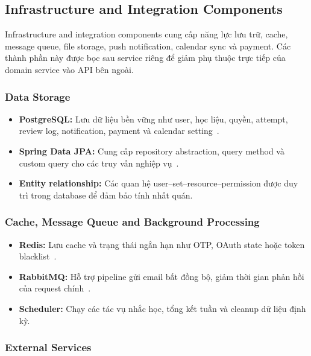 \subsection{Infrastructure and Integration Components}
\label{subsec:infrastructure-components}

Infrastructure and integration components cung cấp năng lực lưu trữ, cache, message queue, file storage, push notification, calendar sync và payment. Các thành phần này được bọc sau service riêng để giảm phụ thuộc trực tiếp của domain service vào API bên ngoài.

\subsubsection{Data Storage}
\label{subsubsec:data-storage-component}

\begin{itemize}
    \item \textbf{PostgreSQL:} Lưu dữ liệu bền vững như user, học liệu, quyền, attempt, review log, notification, payment và calendar setting~\cite{postgresqlabout}.
    \item \textbf{Spring Data JPA:} Cung cấp repository abstraction, query method và custom query cho các truy vấn nghiệp vụ~\cite{springdatajpa}.
    \item \textbf{Entity relationship:} Các quan hệ user--set--resource--permission được duy trì trong database để đảm bảo tính nhất quán.
\end{itemize}

\subsubsection{Cache, Message Queue and Background Processing}
\label{subsubsec:cache-queue-background-component}

\begin{itemize}
    \item \textbf{Redis:} Lưu cache và trạng thái ngắn hạn như OTP, OAuth state hoặc token blacklist~\cite{redisoverview}.
    \item \textbf{RabbitMQ:} Hỗ trợ pipeline gửi email bất đồng bộ, giảm thời gian phản hồi của request chính~\cite{rabbitmqtutorials}.
    \item \textbf{Scheduler:} Chạy các tác vụ nhắc học, tổng kết tuần và cleanup dữ liệu định kỳ.
\end{itemize}

\subsubsection{External Services}
\label{subsubsec:external-services-component}


